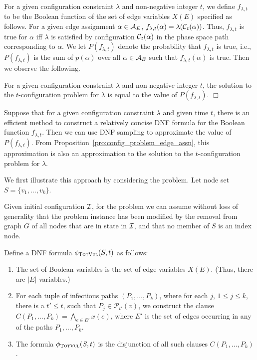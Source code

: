 For a given configuration constraint $\lambda$ and non-negative integer $t$,
 we define $f_{\lambda,t}$ to be the Boolean function of the set of edge variables $X(E)$
 specified as follows.
 For a given edge assignment $\alpha \in {\cal A}_E$, 
 $f_{\lambda,t}(\alpha) = \lambda(\mbox{${\cal C}$}{}_t(\alpha))$.
 Thus, $f_{\lambda,t}$ is true for $\alpha$ iff $\lambda$ is satisfied by
 configuration $\mbox{${\cal C}$}{}_t(\alpha)$ in the phase space path corresponding to $\alpha$.
 We let $P(f_{\lambda,t})$ denote the probability that 
$f_{\lambda,t}$ is true,
 i.e., $P(f_{\lambda,t})$ is the sum of $p(\alpha)$ 
 over all $\alpha \in {\cal A}_E$  such that $f_{\lambda,t}(\alpha)$ is true.
 Then we observe the following.
 
 \begin{proposition}\label{pro:config_problem_edge_assn}
  For a given configuration constraint $\lambda$ and non-negative integer $t$,
 the solution to the $t$-configuration problem for $\lambda$ is equal to the value of
 $P(f_{\lambda,t})$. \hfill$\Box$
 \end{proposition}
 
Suppose that for a given configuration constraint $\lambda$ and given time $t$,
there is an efficient method to construct a relatively concise DNF formula 
for the Boolean function $f_{\lambda,t}$.
Then we can use DNF sampling to approximate the value of $P(f_{\lambda,t})$.
From Proposition~\ref{pro:config_problem_edge_assn},
this approximation is also an approximation to the solution 
to the $t$-configuration problem for $\lambda$.

We first illustrate this approach by considering the \tTotVuls{} problem.
Let node set $S=\{v_1,\ldots, v_k\}$.

Given initial configuration $\mbox{${\cal I}$}{}$, 
for the  \tTotVuls{} problem
we can assume without loss of generality that the problem 
instance  has been modified 
by the removal from graph $G$ of all nodes
that are in state \rstate{} in $\mbox{${\cal I}$}{}$,
and that no member of $S$ is an index node.

Define a DNF formula $\phi_{\textsc{TotVul}}(S,t)$ as follows:
\begin{enumerate}
\item
The set of Boolean variables is the set of edge variables $X(E)$.
(Thus, there are $|E|$ variables.)
\item
For each tuple of infectious paths $(P_1,\ldots,P_k)$, 
where for each $j$, $1 \leq j \leq k$,
there is  a $t' \leq t$,
such that $P_j \in \mathcal{P}_{t'}(v)$,
we construct the clause $C(P_1,\ldots,P_k)=\bigwedge_{e\in E'} x(e)$, where
$E'$ is the set of edges occurring in any of the paths $P_1,\ldots,P_k$.
\item
The formula $\phi_{\textsc{TotVul}}(S,t)$ is the disjunction of all such clauses $C(P_1,\ldots,P_k)$.
\end{enumerate}

